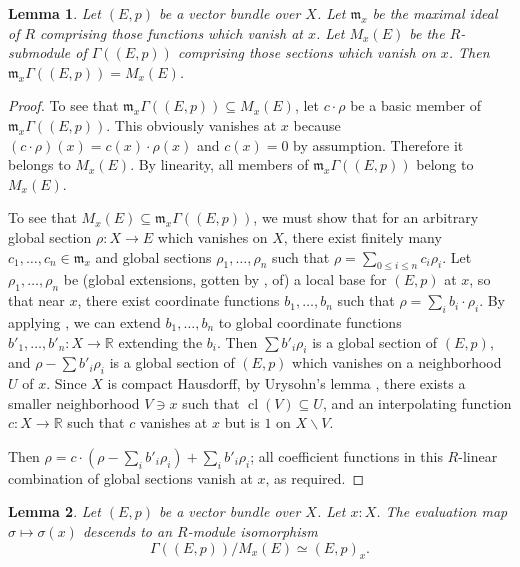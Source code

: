 \documentclass[11pt]{article}
\theoremstyle{plain}
\newtheorem{lemma}{Lemma}[section]
\theoremstyle{definition}
\begin{document}
\begin{lemma}\label{lemma:localization-1}
  Let \((E,p)\) be a vector bundle over \(X\). Let \(\mathfrak{m}_x\) be the maximal ideal of \(R\) comprising those functions which vanish at \(x\). Let \(M_x(E)\) be the \(R\)-submodule of \(\Gamma((E,p))\) comprising those sections which vanish on \(x\). Then \(\mathfrak{m}_x \Gamma((E,p)) = M_x(E)\).
\end{lemma}

\begin{proof}
  To see that \(\mathfrak{m}_x \Gamma((E,p)) \subseteq M_x(E)\), let \(c \cdot \rho\) be a basic member of \(\mathfrak{m}_x \Gamma((E,p))\). This obviously vanishes at \(x\) because \((c \cdot \rho)(x) = c(x) \cdot \rho(x)\) and \(c(x) = 0\) by assumption. Therefore it belongs to \(M_x(E)\). By linearity, all members of \(\mathfrak{m}_x \Gamma((E,p))\) belong to \(M_x(E)\).

  To see that \(M_x(E) \subseteq \mathfrak{m}_x \Gamma((E,p))\), we must show that for an arbitrary global section \(\rho : X \to E\) which vanishes on \(X\), there exist finitely many \(c_1, \dots, c_n \in \mathfrak{m}_x\) and global sections \(\rho_1, \dots, \rho_n\) such that \(\rho = \sum_{0 \leq i \leq n} c_i \rho_i\). Let \(\rho_1, \dots, \rho_n\) be (global extensions, gotten by , of) a local base for \((E,p)\) at \(x\), so that near \(x\), there exist coordinate functions \(b_1, \dots, b_n\) such that \(\rho = \sum_i b_i \cdot \rho_i\). By applying , we can extend \(b_1, \dots, b_n\) to global coordinate functions \(b'_1, \dots, b'_n : X \to \mathbb{R}\) extending the \(b_i\). Then \(\sum b'_i \rho_i\) is a global section of \((E,p)\), and \(\rho - \sum b'_i \rho_i\) is a global section of \((E,p)\) which vanishes on a neighborhood \(U\) of \(x\). Since \(X\) is compact Hausdorff, by Urysohn's lemma , there exists a smaller neighborhood \(V \ni x\) such that \(\operatorname{cl}(V) \subseteq U\), and an interpolating function \(c : X \to \mathbb{R}\) such that \(c\) vanishes at \(x\) but is \(1\) on \(X \backslash V\).

  Then \(\rho = c \cdot \left(\rho - \sum_i b'_i \rho_i \right) + \sum_i b'_i \rho_i\); all coefficient functions in this \(R\)-linear combination of global sections vanish at \(x\), as required.
\end{proof}

\begin{lemma}\label{lemma:localization-2}
  Let \((E,p)\) be a vector bundle over \(X\). Let \(x : X\). The evaluation map \(\sigma \mapsto \sigma(x)\) descends to an \(R\)-module isomorphism
  \[
    \Gamma((E,p))/M_x(E) \simeq (E,p)_x.
  \]
\end{lemma}
\end{document}
